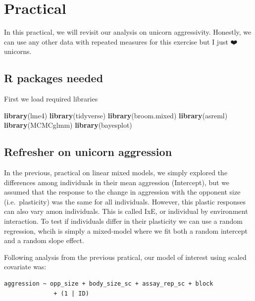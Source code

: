 \documentclass[
  12pt,
]{book}
\newenvironment{Shaded}{\begin{snugshade}}{\end{snugshade}}
\newcommand{\KeywordTok}[1]{\textcolor[rgb]{0.13,0.29,0.53}{\textbf{#1}}}
\newcommand{\NormalTok}[1]{#1}
\begin{document}
\hypertarget{practical-7}{%
\section{Practical}\label{practical-7}}

In this practical, we will revisit our analysis on unicorn aggressivity.
Honestly, we can use any other data with repeated measures for this exercise
but I just ❤️ unicorns.

\hypertarget{r-packages-needed-3}{%
\subsection{R packages needed}\label{r-packages-needed-3}}

First we load required libraries

\begin{Shaded}
\begin{Highlighting}[]
\KeywordTok{library}\NormalTok{(lme4)}
\KeywordTok{library}\NormalTok{(tidyverse)}
\KeywordTok{library}\NormalTok{(broom.mixed)}
\KeywordTok{library}\NormalTok{(asreml)}
\KeywordTok{library}\NormalTok{(MCMCglmm)}
\KeywordTok{library}\NormalTok{(bayesplot)}
\end{Highlighting}
\end{Shaded}

\hypertarget{refresher-on-unicorn-aggression}{%
\subsection{Refresher on unicorn aggression}\label{refresher-on-unicorn-aggression}}

In the previous, practical on linear mixed models, we simply explored the differences among individuals in their mean aggression (Intercept), but we assumed that the response to the change in aggression with the opponent size (i.e.~plasticity) was the same for all individuals. However, this plastic responses can also vary amon individuals. This is called IxE, or individual by environment interaction. To test if individuals differ in their plasticity we can use a random regression, whcih is simply a mixed-model where we fit both a random intercept and a random slope effect.

Following analysis from the previous pratical, our model of interest using scaled covariate was:

\begin{verbatim}
aggression ~ opp_size + body_size_sc + assay_rep_sc + block
              + (1 | ID)
\end{verbatim}
\end{document}
